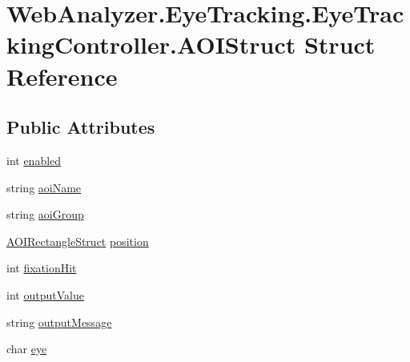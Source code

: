 \hypertarget{struct_web_analyzer_1_1_eye_tracking_1_1_eye_tracking_controller_1_1_a_o_i_struct}{}\section{Web\+Analyzer.\+Eye\+Tracking.\+Eye\+Tracking\+Controller.\+A\+O\+I\+Struct Struct Reference}
\label{struct_web_analyzer_1_1_eye_tracking_1_1_eye_tracking_controller_1_1_a_o_i_struct}
\subsection*{Public Attributes}
\begin{DoxyCompactItemize}
\item 
int \hyperlink{struct_web_analyzer_1_1_eye_tracking_1_1_eye_tracking_controller_1_1_a_o_i_struct_a08d87a8668600f9be50b91caef4d5e23}{enabled}
\item 
string \hyperlink{struct_web_analyzer_1_1_eye_tracking_1_1_eye_tracking_controller_1_1_a_o_i_struct_a058a24c0ad954b7a429b228b2e2f432d}{aoi\+Name}
\item 
string \hyperlink{struct_web_analyzer_1_1_eye_tracking_1_1_eye_tracking_controller_1_1_a_o_i_struct_af2ac139db77893fa66dd7bc87da6b86f}{aoi\+Group}
\item 
\hyperlink{struct_web_analyzer_1_1_eye_tracking_1_1_eye_tracking_controller_1_1_a_o_i_rectangle_struct}{A\+O\+I\+Rectangle\+Struct} \hyperlink{struct_web_analyzer_1_1_eye_tracking_1_1_eye_tracking_controller_1_1_a_o_i_struct_afb63f84a1078801a841b45ef824b1117}{position}
\item 
int \hyperlink{struct_web_analyzer_1_1_eye_tracking_1_1_eye_tracking_controller_1_1_a_o_i_struct_a4718fcb09ea85e6fffea88bff797049a}{fixation\+Hit}
\item 
int \hyperlink{struct_web_analyzer_1_1_eye_tracking_1_1_eye_tracking_controller_1_1_a_o_i_struct_adc29300e5fb7c65d165375c88494bf20}{output\+Value}
\item 
string \hyperlink{struct_web_analyzer_1_1_eye_tracking_1_1_eye_tracking_controller_1_1_a_o_i_struct_a003358361ea7827329f72d55bee09ddc}{output\+Message}
\item 
char \hyperlink{struct_web_analyzer_1_1_eye_tracking_1_1_eye_tracking_controller_1_1_a_o_i_struct_ab75cb81e8a540e60a2ee624786116972}{eye}
\end{DoxyCompactItemize}


